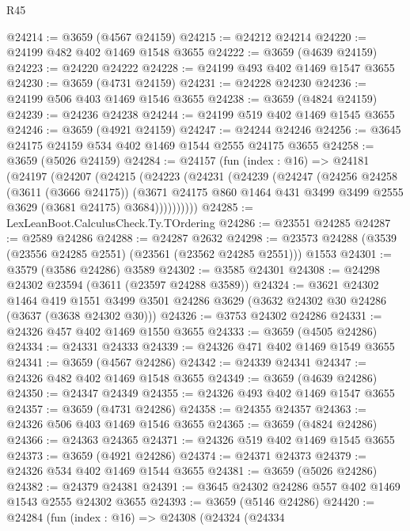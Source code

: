 \begin{lexlean}{R45}
\begin{coremodule}
@24214 := @3659 (@4567 @24159)
@24215 := @24212 @24214
@24220 := @24199 @482 @402 @1469 @1548 @3655
@24222 := @3659 (@4639 @24159)
@24223 := @24220 @24222
@24228 := @24199 @493 @402 @1469 @1547 @3655
@24230 := @3659 (@4731 @24159)
@24231 := @24228 @24230
@24236 := @24199 @506 @403 @1469 @1546 @3655
@24238 := @3659 (@4824 @24159)
@24239 := @24236 @24238
@24244 := @24199 @519 @402 @1469 @1545 @3655
@24246 := @3659 (@4921 @24159)
@24247 := @24244 @24246
@24256 := @3645 @24175 @24159 @534 @402 @1469 @1544 @2555 @24175 @3655
@24258 := @3659 (@5026 @24159)
@24284 := @24157
    (fun (index : @16) =>
    @24181
      (@24197
        (@24207
          (@24215
            (@24223
              (@24231
                (@24239
                  (@24247
                    (@24256
                      @24258
                      (@3611 (@3666 @24175))
                      (@3671
                        @24175
                        @860
                        @1464
                        @431
                        @3499
                        @3499
                        @2555
                        @3629
                        (@3681 @24175)
                        @3684))))))))))
@24285 := LexLeanBoot.CalculusCheck.Ty.TOrdering
@24286 := @23551 @24285
@24287 := @2589 @24286
@24288 := @24287 @2632
@24298 := @23573 @24288 (@3539 (@23556 @24285 @2551) (@23561 (@23562 @24285 @2551))) @1553
@24301 := @3579 (@3586 @24286) @3589
@24302 := @3585 @24301
@24308 := @24298 @24302 @23594 (@3611 (@23597 @24288 @3589))
@24324 := @3621
    @24302
    @1464
    @419
    @1551
    @3499
    @3501
    @24286
    @3629
    (@3632 @24302 @30 @24286 (@3637 (@3638 @24302 @30)))
@24326 := @3753 @24302 @24286
@24331 := @24326 @457 @402 @1469 @1550 @3655
@24333 := @3659 (@4505 @24286)
@24334 := @24331 @24333
@24339 := @24326 @471 @402 @1469 @1549 @3655
@24341 := @3659 (@4567 @24286)
@24342 := @24339 @24341
@24347 := @24326 @482 @402 @1469 @1548 @3655
@24349 := @3659 (@4639 @24286)
@24350 := @24347 @24349
@24355 := @24326 @493 @402 @1469 @1547 @3655
@24357 := @3659 (@4731 @24286)
@24358 := @24355 @24357
@24363 := @24326 @506 @403 @1469 @1546 @3655
@24365 := @3659 (@4824 @24286)
@24366 := @24363 @24365
@24371 := @24326 @519 @402 @1469 @1545 @3655
@24373 := @3659 (@4921 @24286)
@24374 := @24371 @24373
@24379 := @24326 @534 @402 @1469 @1544 @3655
@24381 := @3659 (@5026 @24286)
@24382 := @24379 @24381
@24391 := @3645 @24302 @24286 @557 @402 @1469 @1543 @2555 @24302 @3655
@24393 := @3659 (@5146 @24286)
@24420 := @24284
    (fun (index : @16) =>
    @24308
      (@24324
        (@24334

\end{coremodule}
\end{lexlean}
